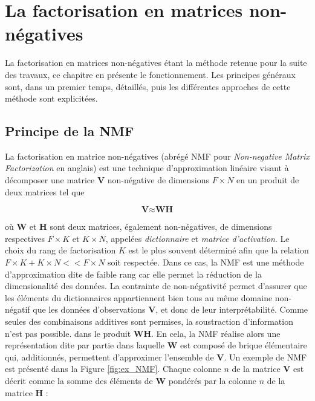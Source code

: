%
%
%
%
%
\chapter{La factorisation en matrices non-négatives}
La factorisation en matrices non-négatives étant la méthode retenue pour la suite des travaux, ce chapitre en présente le fonctionnement. Les principes généraux sont, dans un premier temps, détaillés, puis les différentes approches de cette méthode sont explicitées.

\section{Principe de la NMF}
La factorisation en matrice non-négatives (abrégé NMF pour \textit{Non-negative Matrix Factorization} en anglais) est une technique d'approximation linéaire visant à décomposer une matrice $\textbf{V}$ non-négative de dimensions $F \times N$ en un produit de deux matrices tel que

\begin{equation}
\textbf{V} \approx \textbf{WH}
\end{equation}

où $\textbf{W}$ et $\textbf{H}$ sont deux matrices, également non-négatives, de dimensions respectives $F \times K$ et $K \times N$, appelées \textit{dictionnaire} et \textit{matrice d'activation}. Le choix du rang de factorisation $K$ est le plus souvent déterminé afin que la relation $F \times K + K \times N << F \times N$ soit respectée. Dans ce cas, la NMF est une méthode d'approximation dite de faible rang car elle permet la réduction de la dimensionalité des données. La contrainte de non-négativité permet d'assurer que les éléments du dictionnaires appartiennent bien tous au même domaine non-négatif que les données d'observations $\mathbf{V}$, et donc de leur interprétabilité. Comme seules des combinaisons additives sont permises, la soustraction d'information n'est pas possible. dans le produit $\mathbf{WH}$. En cela, la NMF réalise alors une représentation dite \og par partie \fg{} dans laquelle $\mathbf{W}$ est composé de brique élémentaire qui, additionnés, permettent d'approximer l'ensemble de $\mathbf{V}$. Un exemple de NMF est présenté dans la Figure \ref{fig:ex_NMF}. Chaque colonne $n$ de la matrice $\mathbf{V}$ est décrit comme la somme des éléments de $\mathbf{W}$ pondérés par la colonne $n$ de la matrice $\mathbf{H}$ : 

